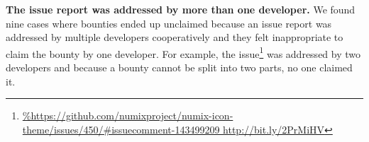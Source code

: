 \noindent\textbf{The issue report was addressed by more than one developer.} We found nine cases where bounties ended up unclaimed because an issue report was addressed by multiple developers cooperatively and they felt inappropriate to claim the bounty by one developer. For example, the issue\footnote{\url{%
http://bit.ly/2PrMiHV}} was addressed by two developers and because a bounty cannot be split into two parts, no one claimed it.



